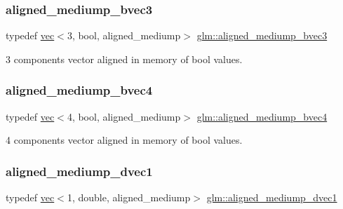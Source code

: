 \subsubsection{\texorpdfstring{aligned\+\_\+mediump\+\_\+bvec3}{aligned\_mediump\_bvec3}}
{\footnotesize\ttfamily typedef \mbox{\hyperlink{structglm_1_1vec}{vec}}$<$3, bool, aligned\+\_\+mediump$>$ \mbox{\hyperlink{group__gtc__type__aligned_ga09e9fbc2d4dd00aa1319255fad4d7209}{glm\+::aligned\+\_\+mediump\+\_\+bvec3}}}



3 components vector aligned in memory of bool values. 

\mbox{\label{group__gtc__type__aligned_gaa5fba8713e0381efe85996169fbc2bcc}} 
\subsubsection{\texorpdfstring{aligned\+\_\+mediump\+\_\+bvec4}{aligned\_mediump\_bvec4}}
{\footnotesize\ttfamily typedef \mbox{\hyperlink{structglm_1_1vec}{vec}}$<$4, bool, aligned\+\_\+mediump$>$ \mbox{\hyperlink{group__gtc__type__aligned_gaa5fba8713e0381efe85996169fbc2bcc}{glm\+::aligned\+\_\+mediump\+\_\+bvec4}}}



4 components vector aligned in memory of bool values. 

\mbox{\label{group__gtc__type__aligned_gad123cfb2803e67ae9f973bbd57bf86e3}} 
\subsubsection{\texorpdfstring{aligned\+\_\+mediump\+\_\+dvec1}{aligned\_mediump\_dvec1}}
{\footnotesize\ttfamily typedef \mbox{\hyperlink{structglm_1_1vec}{vec}}$<$1, double, aligned\+\_\+mediump$>$ \mbox{\hyperlink{group__gtc__type__aligned_gad123cfb2803e67ae9f973bbd57bf86e3}{glm\+::aligned\+\_\+mediump\+\_\+dvec1}}}



